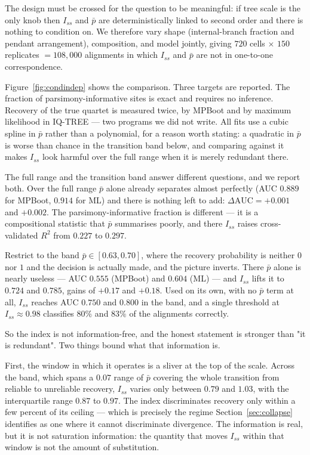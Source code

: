\documentclass[11pt]{article}
\newcommand{\Iss}{I_{ss}}
\theoremstyle{definition}
\theoremstyle{remark}
\begin{document}
The design must be crossed for the question to be meaningful: if tree scale
is the only knob then $\Iss$ and $\bar p$ are deterministically linked to
second order and there is nothing to condition on. We therefore vary shape
(internal-branch fraction and pendant arrangement), composition, and model
jointly, giving $720$ cells $\times$ $150$ replicates $= 108{,}000$
alignments in which $\Iss$ and $\bar p$ are not in one-to-one correspondence.

Figure~\ref{fig:condindep} shows the comparison. Three targets are reported.
The fraction of parsimony-informative sites is
exact and requires no inference. Recovery of the true quartet is measured
twice, by MPBoot and by maximum likelihood in IQ-TREE --- two programs we did
not write. All fits use a cubic spline in $\bar p$ rather than a polynomial,
for a reason worth stating: a quadratic in $\bar p$ is worse than chance in
the transition band below, and comparing against it makes $\Iss$ look
harmful over the full range when it is merely redundant there.

The full range and the transition band answer different questions, and we
report both. Over the full range $\bar p$ alone already separates almost
perfectly (AUC $0.889$ for MPBoot, $0.914$ for ML) and there is nothing left
to add: $\Delta\mathrm{AUC}=+0.001$ and $+0.002$. The
parsimony-informative fraction is different --- it is a compositional
statistic that $\bar p$ summarises poorly, and there $\Iss$ raises
cross-validated $R^2$ from $0.227$ to $0.297$.

Restrict to the band $\bar p\in[0.63,0.70]$, where the recovery probability
is neither $0$ nor $1$ and the decision is actually made, and the picture
inverts. There $\bar p$ alone is nearly useless --- AUC $0.555$ (MPBoot) and
$0.604$ (ML) --- and $\Iss$ lifts it to $0.724$ and $0.785$, gains of $+0.17$
and $+0.18$. Used on its own, with no $\bar p$ term at all, $\Iss$ reaches
AUC $0.750$ and $0.800$ in the band, and a single threshold at
$\Iss\approx0.98$ classifies $80\%$ and $83\%$ of the alignments correctly.

So the index is not information-free, and the honest statement is stronger
than "it is redundant". Two things bound what that information is.

First, the window in which it operates is a sliver at the top of the scale.
Across the band, which spans a $0.07$ range of $\bar p$ covering the whole
transition from reliable to unreliable recovery, $\Iss$ varies only between
$0.79$ and $1.03$, with the interquartile range $0.87$ to $0.97$. The index
discriminates recovery only within a few percent of its ceiling --- which is
precisely the regime Section~\ref{sec:collapse} identifies as one where it
cannot discriminate divergence. The information is real, but it is not
saturation information: the quantity that moves $\Iss$ within that window is
not the amount of substitution.
\end{document}
